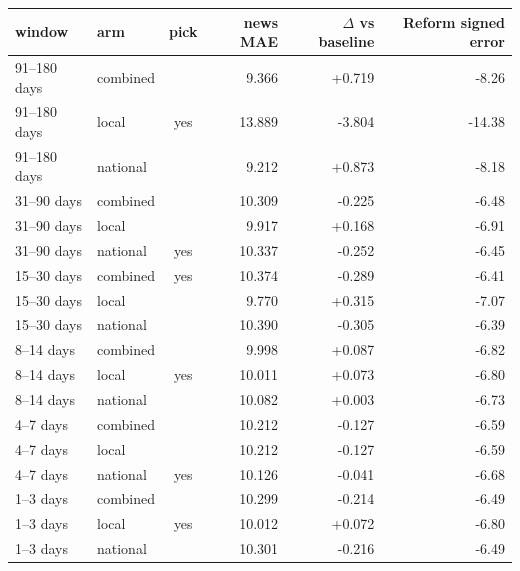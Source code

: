 \begin{tabular}{llcrrr}
\toprule
window & arm & pick & news MAE & $\Delta$ vs baseline & Reform signed error \\
\midrule
91--180 days & combined &  & 9.366 & +0.719 & -8.26 \\
91--180 days & local & yes & 13.889 & -3.804 & -14.38 \\
91--180 days & national &  & 9.212 & +0.873 & -8.18 \\
31--90 days & combined &  & 10.309 & -0.225 & -6.48 \\
31--90 days & local &  & 9.917 & +0.168 & -6.91 \\
31--90 days & national & yes & 10.337 & -0.252 & -6.45 \\
15--30 days & combined & yes & 10.374 & -0.289 & -6.41 \\
15--30 days & local &  & 9.770 & +0.315 & -7.07 \\
15--30 days & national &  & 10.390 & -0.305 & -6.39 \\
8--14 days & combined &  & 9.998 & +0.087 & -6.82 \\
8--14 days & local & yes & 10.011 & +0.073 & -6.80 \\
8--14 days & national &  & 10.082 & +0.003 & -6.73 \\
4--7 days & combined &  & 10.212 & -0.127 & -6.59 \\
4--7 days & local &  & 10.212 & -0.127 & -6.59 \\
4--7 days & national & yes & 10.126 & -0.041 & -6.68 \\
1--3 days & combined &  & 10.299 & -0.214 & -6.49 \\
1--3 days & local & yes & 10.012 & +0.072 & -6.80 \\
1--3 days & national &  & 10.301 & -0.216 & -6.49 \\
\bottomrule
\end{tabular}
